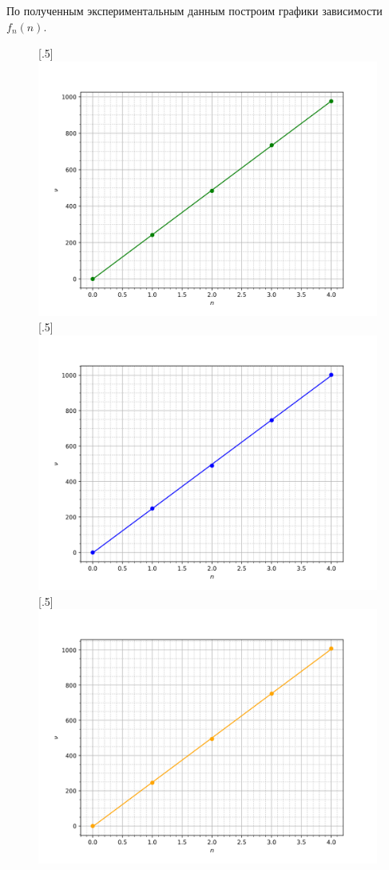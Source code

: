 \documentclass{article}
\begin{document}
По полученным экспериментальным данным построим графики зависимости $ f_n(n) $.

\begin{figure}[h!]
	[.5\linewidth]{%
		\includegraphics[width=\linewidth]{first.png}%
	}%
	\hfill
	[.5\linewidth]{%
		\includegraphics[width=\linewidth]{second.png}%
	}
	[.5\linewidth]{%
		\includegraphics[width=\linewidth]{third.png}%
}
\end{figure}
\end{document}
